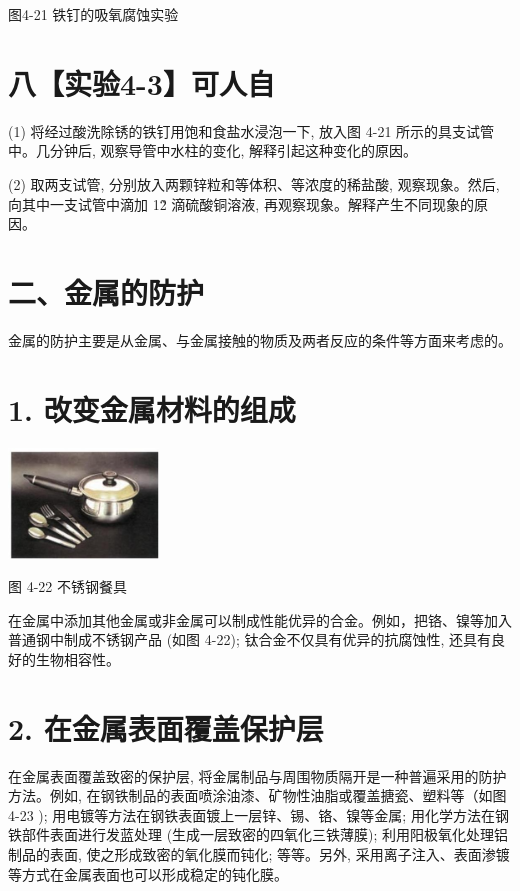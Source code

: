 \documentclass[10pt]{article}
\begin{document}
图4-21 铁钉的吸氧腐蚀实验

\section*{八【实验4-3】可人自}

(1) 将经过酸洗除锈的铁钉用饱和食盐水浸泡一下, 放入图 4-21 所示的具支试管中。几分钟后, 观察导管中水柱的变化, 解释引起这种变化的原因。

(2) 取两支试管, 分别放入两颗锌粒和等体积、等浓度的稀盐酸, 观察现象。然后, 向其中一支试管中滴加 1\~2 滴硫酸铜溶液, 再观察现象。解释产生不同现象的原因。

\section*{二、金属的防护}

金属的防护主要是从金属、与金属接触的物质及两者反应的条件等方面来考虑的。

\section*{1. 改变金属材料的组成}

\begin{center}
\includegraphics[max width=0.3\textwidth]{images/0190da9d-8bfd-732f-bc2c-0b21d0f13b91_118_999930.jpg}
\end{center}

图 4-22 不锈钢餐具

在金属中添加其他金属或非金属可以制成性能优异的合金。例如，把铬、镍等加入普通钢中制成不锈钢产品 (如图 4-22); 钛合金不仅具有优异的抗腐蚀性, 还具有良好的生物相容性。

\section*{2. 在金属表面覆盖保护层}

在金属表面覆盖致密的保护层, 将金属制品与周围物质隔开是一种普遍采用的防护方法。例如, 在钢铁制品的表面喷涂油漆、矿物性油脂或覆盖搪瓷、塑料等（如图 4-23 ); 用电镀等方法在钢铁表面镀上一层锌、锡、铬、镍等金属; 用化学方法在钢铁部件表面进行发蓝处理 (生成一层致密的四氧化三铁薄膜); 利用阳极氧化处理铝制品的表面, 使之形成致密的氧化膜而钝化; 等等。另外, 采用离子注入、表面渗镀等方式在金属表面也可以形成稳定的钝化膜。
\end{document}
